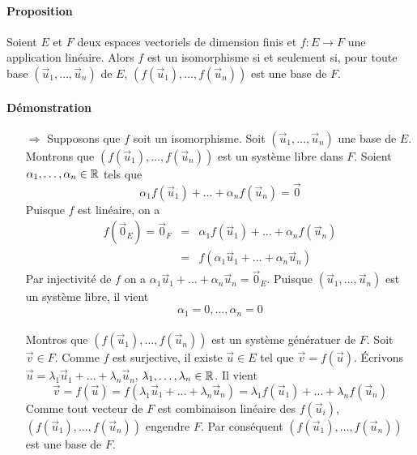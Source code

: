 \paragraph{Proposition} Soient $E$ et $F$ deux espaces vectoriels de dimension finis et $f: E \rightarrow F$ une application linéaire. Alors $f$ est un isomorphisme si et seulement si, pour toute base $(\vec{u}_1, \ldots, \vec{u}_n)$ de $E$, $(f(\vec{u}_1), \ldots, f(\vec{u}_n))$ est une base de $F$.

\paragraph{Démonstration} 
\begin{itemize}
  \item[$\Rightarrow$]Supposons que $f$ soit un isomorphisme. Soit $(\vec{u}_1, \ldots, \vec{u}_n)$ une base de $E$. Montrons que $(f(\vec{u}_1), \ldots, f(\vec{u}_n))$ est un système libre dans $F$. Soient $\alpha_1, \ldots, \alpha_n \in \mathbb{R}$ tels que 
    $$\alpha_1 f(\vec{u}_1) + \ldots + \alpha_n f(\vec{u}_n) = \vec{0}$$
    Puisque $f$ est linéaire, on a
    \begin{eqnarray*}
      f(\vec{0}_E) = \vec{0}_F &=& \alpha_1 f(\vec{u}_1) + \ldots + \alpha_n f(\vec{u}_n) \\
        &=& f(\alpha_1 \vec{u}_1 + \ldots + \alpha_n \vec{u}_n)
    \end{eqnarray*}
    Par injectivité de $f$ on a $\alpha_1 \vec{u}_1 + \ldots + \alpha_n \vec{u}_n = \vec{0}_E$. Puisque $(\vec{u}_1, \ldots, \vec{u}_n)$ est un système libre, il vient 
    $$\alpha_1 = 0, \ldots, \alpha_n = 0$$ \\
    Montros que $(f(\vec{u}_1), \ldots, f(\vec{u}_n))$ est un système génératuer de $F$. Soit $\vec{v} \in F$. Comme $f$ est surjective, il existe $\vec{u} \in E$ tel que $\vec{v} = f(\vec{u})$. Écrivons $\vec{u} = \lambda_1 \vec{u}_1 + \ldots + \lambda_n \vec{u}_n$, $\lambda_1, \ldots, \lambda_n \in \mathbb{R}$. Il vient
    $$\vec{v} = f(\vec{u}) = f(\lambda_1 \vec{u}_1 + \ldots + \lambda_n \vec{u}_n) = \lambda_1 f(\vec{u}_1) + \ldots + \lambda_n f(\vec{u}_n)$$
    Comme tout vecteur de $F$ est combinaison linéaire des $f(\vec{u}_i)$, $(f(\vec{u}_1), \ldots, f(\vec{u}_n))$ engendre $F$. Par conséquent $(f(\vec{u}_1), \ldots, f(\vec{u}_n))$ est une base de $F$.
    

\end{itemize}
